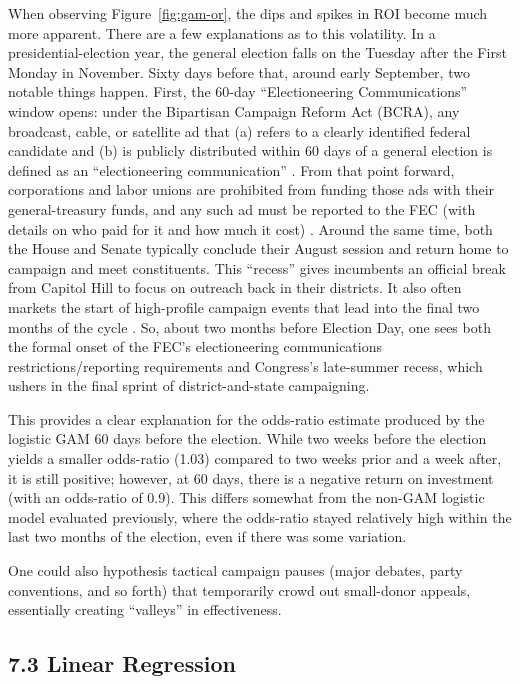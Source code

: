 When observing Figure~\ref{fig:gam-or}, the dips and spikes in ROI become much more apparent. There are a few explanations as to this volatility. In a presidential-election year, the general election falls on the Tuesday after the First Monday in November. Sixty days before that, around early September, two notable things happen. First, the 60-day ``Electioneering Communications'' window opens: under the Bipartisan Campaign Reform Act (BCRA), any broadcast, cable, or satellite ad that (a) refers to a clearly identified federal candidate and (b) is publicly distributed within 60 days of a general election is defined as an ``electioneering communication'' \cite{fec_communications}. From that point forward, corporations and labor unions are prohibited from funding those ads with their general-treasury funds, and any such ad must be reported to the FEC (with details on who paid for it and how much it cost) \cite{congress_plaw}. Around the same time, both the House and Senate typically conclude their August session and return home to campaign and meet constituents. This ``recess'' gives incumbents an official break from Capitol Hill to focus on outreach back in their districts. It also often markets the start of high-profile campaign events that lead into the final two months of the cycle \cite{schedule}. So, about two months before Election Day, one sees both the formal onset of the FEC's electioneering communications restrictions/reporting requirements and Congress's late-summer recess, which ushers in the final sprint of district-and-state campaigning.

This provides a clear explanation for the odds-ratio estimate produced by the logistic GAM 60 days before the election. While two weeks before the election yields a smaller odds-ratio (1.03) compared to two weeks prior and a week after, it is still positive; however, at 60 days, there is a negative return on investment (with an odds-ratio of 0.9). This differs somewhat from the non-GAM logistic model evaluated previously, where the odds-ratio stayed relatively high within the last two months of the election, even if there was some variation.

One could also hypothesis tactical campaign pauses (major debates, party conventions, and so forth) that temporarily crowd out small-donor appeals, essentially creating ``valleys'' in effectiveness.

\subsection*{7.3 Linear Regression}

